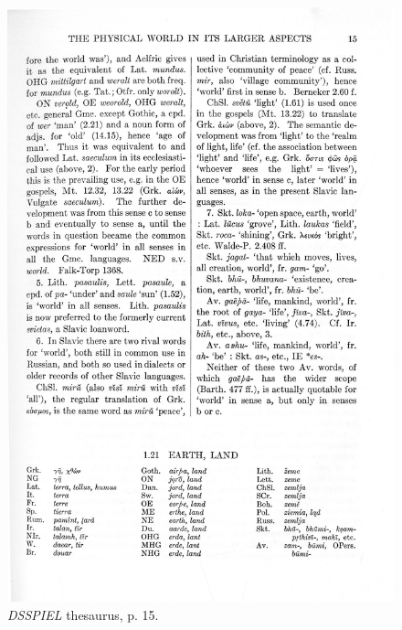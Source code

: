 \begin{figure}[htbp]
  \centering
    \includegraphics[width=\linewidth]{Stolk_thes-content/fig/thes/DSSPIEL-p0015.jpg}
    \caption{\textit{DSSPIEL} thesaurus, p. 15.}
  \label{fig:1.A:DSSPIEL:thesaurus}
\end{figure}

